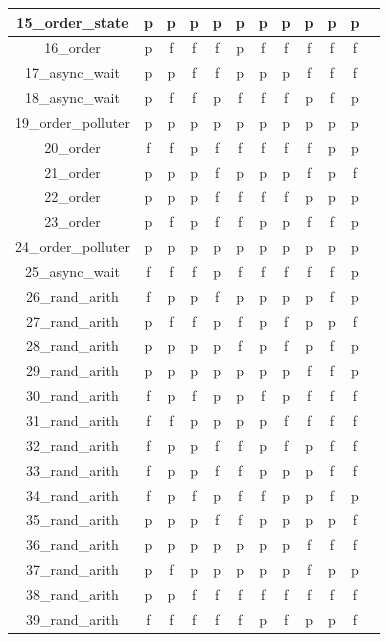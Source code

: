 \documentclass[
fancyheadings, %
%
%
]{stsreprt}
\begin{document}
\begin{longtable}{|c|c|c|c|c|c|c|c|c|c|c|c|}
\hline
15\_order\_state & p & p & p & p & p & p & p & p & p & p \\
\hline
16\_order & p & f & f & f & p & f & f & f & f & f \\
\hline
17\_async\_wait & p & p & f & f & p & p & p & f & f & f \\
\hline
18\_async\_wait & p & f & f & p & f & f & f & p & f & p \\
\hline
19\_order\_polluter & p & p & p & p & p & p & p & p & p & p \\
\hline
20\_order & f & f & p & f & f & f & f & f & p & p \\
\hline
21\_order & p & p & p & f & p & p & p & f & p & f \\
\hline
22\_order & p & p & p & f & f & f & f & p & p & p \\
\hline
23\_order & p & f & p & f & f & p & p & f & f & p \\
\hline
24\_order\_polluter & p & p & p & p & p & p & p & p & p & p \\
\hline
25\_async\_wait & f & f & f & p & f & f & f & f & f & p \\
\hline
26\_rand\_arith & f & p & p & f & p & p & p & p & f & p \\
\hline
27\_rand\_arith & p & f & f & p & f & p & f & p & p & f \\
\hline
28\_rand\_arith & p & p & p & p & f & p & f & p & f & p \\
\hline
29\_rand\_arith & p & p & p & p & p & p & p & f & f & p \\
\hline
30\_rand\_arith & f & p & f & p & p & f & p & f & f & f \\
\hline
31\_rand\_arith & f & f & p & p & p & p & f & f & f & f \\
\hline
32\_rand\_arith & f & p & p & f & f & p & f & p & f & f \\
\hline
33\_rand\_arith & f & p & p & f & f & p & p & p & f & f \\
\hline
34\_rand\_arith & f & p & f & p & f & f & p & p & f & p \\
\hline
35\_rand\_arith & p & p & p & f & f & p & p & p & p & f \\
\hline
36\_rand\_arith & p & p & p & p & p & p & p & f & f & f \\
\hline
37\_rand\_arith & p & f & p & p & p & p & p & f & p & p \\
\hline
38\_rand\_arith & p & p & f & f & f & f & f & f & f & f \\
\hline
39\_rand\_arith & f & f & f & f & f & p & f & p & p & f \\

\end{longtable}
\end{document}
